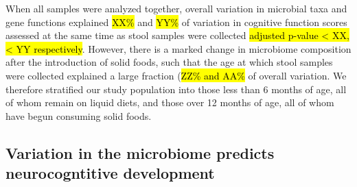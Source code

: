 When all samples were analyzed together,
overall variation in microbial taxa and gene functions
explained \hl{XX\%} and \hl{YY\%} of variation in cognitive function scores
assessed at the same time as stool samples were collected
\hl{adjusted p-value < XX, < YY respectively}. 
However, there is a marked change in microbiome composition
after the introduction of solid foods,
such that the age at which stool samples were collected
explained a large fraction (\hl{ZZ\% and AA\%} of overall variation.
We therefore stratified our study population into those
less than 6 months of age, all of whom remain on liquid diets,
and those over 12 months of age, all of whom have begun consuming solid foods.




\subsection*{Variation in the microbiome predicts neurocogntitive development}